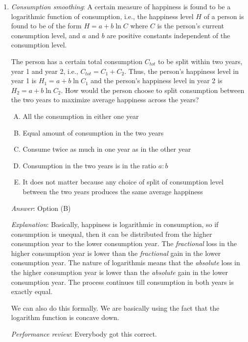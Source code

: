 \documentclass[10pt]{amsart}
\begin{document}
\begin{enumerate}
  {\em Performance review}: $2$ people got this correct. $6$ chose
  (E), $2$ chose (D), $1$ chose (B).

\item {\em Consumption smoothing}: A certain measure of happiness is
  found to be a logarithmic function of consumption, i.e., the
  happiness level $H$ of a person is found to be of the form $H = a +
  b \ln C$ where $C$ is the person's current consumption level, and
  $a$ and $b$ are positive constants independent of the consumption
  level.

  The person has a certain total consumption $C_{tot}$ to be split
  within two years, year 1 and year 2, i.e., $C_{tot} = C_1 +
  C_2$. Thus, the person's happiness level in year 1 is $H_1 = a + b
  \ln C_1$ and the person's happiness level in year 2 is $H_2 = a + b
  \ln C_2$. How would the person choose to split consumption between
  the two years to maximize average happiness across the years?

  \begin{enumerate}[(A)]
  \item All the consumption in either one year
  \item Equal amount of consumption in the two years
  \item Consume twice as much in one year as in the other year
  \item Consumption in the two years is in the ratio $a:b$
  \item It does not matter because any choice of split of consumption
    level between the two years produces the same average happiness
  \end{enumerate}

  {\em Answer}: Option (B)

  {\em Explanation}: Basically, happiness is logarithmic in
  consumption, so if consumption is unequal, then it can be
  distributed from the higher consumption year to the lower
  consumption year. The {\em fractional} loss in the higher
  consumption year is lower than the {\em fractional} gain in the
  lower consumption year. The nature of logarithmis means that the
  {\em absolute} loss in the higher consumption year is lower than the
  {\em absolute} gain in the lower consumption year. The process
  continues till consumption in both years is exactly equal.

  We can also do this formally. We are basically using the fact that
  the logarithm function is concave down.

  {\em Performance review}: Everybody got this correct.


\end{enumerate}
\end{document}
